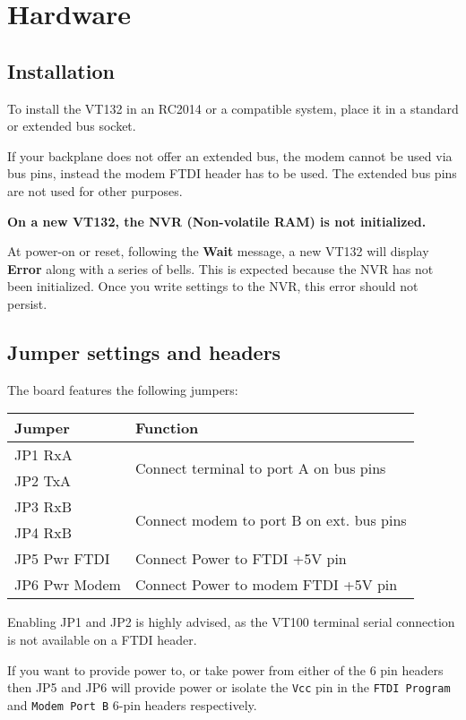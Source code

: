 \appendix

\chapter{Hardware}

\section{Installation}

To install the VT132 in an RC2014 or a compatible system, place it in a standard or extended bus socket.

If your backplane does not offer an extended bus, the modem cannot be used via bus pins, instead the modem FTDI header has to be used.
The extended bus pins are not used for other purposes.

\textbf{On a new VT132, the NVR (Non-volatile RAM) is not initialized.}

At power-on or reset, following the \textbf{Wait} message, a new VT132 will display \textbf{Error} along with a series of bells.
This is expected because the NVR has not been initialized.
Once you write settings to the NVR, this error should not persist.

\section{Jumper settings and headers}

The board features the following jumpers:

\begin{tabular}{p{7em} | p{}}
\hline
\textbf{Jumper} & \textbf{Function} \\
\hline
JP1 RxA & \multirow{2}{*}{Connect terminal to port A on bus pins} \\
JP2 TxA \\
\hline
JP3 RxB & \multirow{2}{*}{Connect modem to port B on ext. bus pins} \\
JP4 RxB \\
\hline
JP5 Pwr FTDI & Connect Power to FTDI +5V pin \\
\hline
JP6 Pwr Modem & Connect Power to modem FTDI +5V pin \\
\hline
\end{tabular}

Enabling JP1 and JP2 is highly advised, as the VT100 terminal serial connection is not available on a FTDI header.

If you want to provide power to, or take power from either of the 6 pin headers then JP5 and JP6 will provide power
or isolate the \texttt{Vcc} pin in the \texttt{FTDI Program} and \texttt{Modem Port B} 6-pin headers respectively.

